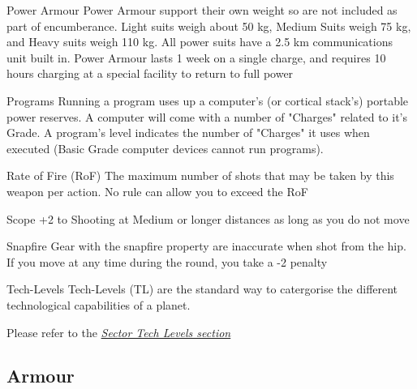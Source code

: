 \begin{multicols}{2}
\begin{genericsection}{Power Armour}
Power Armour support their own weight so are not included as part of encumberance. Light suits weigh about 50 kg, Medium Suits weigh 75 kg, and Heavy suits weigh 110 kg. All power suits have a 2.5 km communications unit built in. Power Armour lasts 1 week on a single charge, and requires 10 hours charging at a special facility to return to full power
\end{genericsection}

\begin{genericsection}{Programs}
\label{sec:gear-programs}
Running a program uses up a computer's (or cortical stack's) portable power reserves. A computer will come with a number of "Charges" related to it's Grade. A program's level indicates the number of "Charges" it uses when executed (Basic Grade computer devices cannot run programs).
\end{genericsection}

\begin{genericsection}{Rate of Fire (RoF)}
The maximum number of shots that may be taken by this weapon per action. No rule can allow you to exceed the RoF
\end{genericsection}

\begin{genericsection}{Scope}
+2 to Shooting at Medium or longer distances as long as you do not move
\end{genericsection}

\begin{genericsection}{Snapfire}
Gear with the snapfire property are inaccurate when shot from the hip. If you move at any time during the round, you take a -2 penalty
\end{genericsection}

\begin{genericsection}{Tech-Levels}
Tech-Levels (TL) are the standard way to catergorise the different technological capabilities of a planet. 

Please refer to the \textit{\hyperref[sec:sector-tech-levels]{Sector Tech Levels section}}
\end{genericsection}

\end{multicols}

\subsection{Armour}

